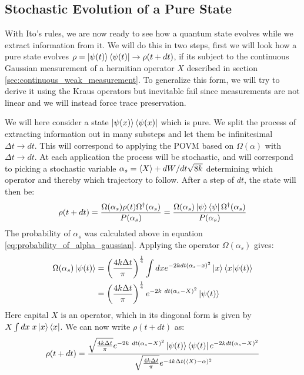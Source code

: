 \subsection{Stochastic Evolution of a Pure State}
With Ito's rules, we are now ready to see how a quantum state evolves while we extract information from it. We will do this in two steps, first we will look how a pure state evolves $\rho = \ket{\psi(t)}\bra{\psi(t)} \to \rho(t+dt)$, if its subject to the continuous Gaussian measurement of a hermitian operator $X$ described in section \ref{sec:continuous_weak_measurement}. To generalize this form, we will try to derive it using the Kraus operators but inevitable fail since measurements are not linear and we will instead force trace preservation.

We will here consider a state $\ket{\psi(x)}\bra{\psi(x)}$ which is pure. We split the process of extracting information out in many substeps and let them be infinitesimal $\Delta t \to dt$. This will correspond to applying the POVM based on ${\Omega(\alpha)}$ with $\Delta t \to dt$. At each application the process will be stochastic, and will correspond to picking a stochastic variable $\alpha_s =\expval{X} + {dW}/{dt \sqrt{8k}}$ determining which operator and thereby which trajectory to follow. After a step of $dt$, the state will then be:
\begin{equation}
    \rho(t+dt) = \frac{\Omega(\alpha_s) \rho(t)  \Omega^\dagger(\alpha_s)}{P(\alpha_s)} = \frac{\Omega(\alpha_s) \ket{\psi}\bra{\psi}  \Omega^\dagger(\alpha_s)}{P(\alpha_s)} 
\end{equation}
The probability of $\alpha_s$ was calculated above in equation \ref{eq:probability_of_alpha_gaussian}. Applying the operator $\Omega(\alpha_s)$ gives:
\begin{align*}
    \Omega(\alpha_s)\ket{\psi(t)} &=  \left(\frac{4 k \Delta t}{\pi}\right)^\frac14\int dx e^{-2k dt (\alpha_s - x)^2} \ket{x}\bra{x} \ket{\psi(t)} \\
                                  &=  \left(\frac{4 k \Delta t}{\pi}\right)^\frac14 e^{-2k\ dt (\alpha_s - X)^2} \ket{\psi(t)}
\end{align*}
Here capital $X$ is an operator, which in its diagonal form is given by $X \int dx \;x \ket{x}\bra{x}$. We can now write $\rho(t+dt)$ as:
\begin{equation}
    \rho(t + dt) =\frac{\sqrt{\frac{4 k \Delta t}{\pi}}e^{-2k\ dt (\alpha_s - X)^2} \ket{\psi(t)}\bra{\psi(t)}e^{-2k dt (\alpha_s - X)^2}}{\sqrt{\frac{4 k \Delta t}{\pi}}  e^{-4k\Delta t (\expval{X} - \alpha)^2}}    
\end{equation}
